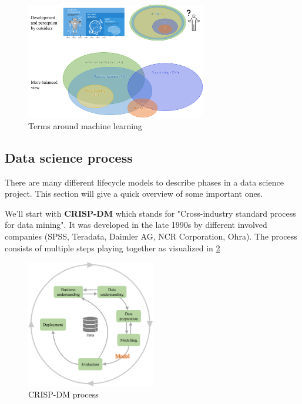 \begin{figure}[H]
  \centering
  \includegraphics[width=0.7\textwidth]{assets/basics/confusion_terminology.png}
  \caption{Terms around machine learning}
  \label{fig:1_ml_terminology}
\end{figure}


\subsection{Data science process}
There are many different lifecycle models to describe phases in a data science project. This section will give a quick overview of some important ones.

We'll start with \textbf{CRISP-DM} which stands for "Cross-industry standard process for data mining". It was developed in the late 1990s by different involved companies (SPSS, Teradata, Daimler AG, NCR Corporation, Ohra). The process consists of multiple steps playing together as visualized in \ref{fig:1_crisp_dm}

\begin{figure}[H]
  \centering
  \includegraphics[width=0.5\textwidth]{assets/basics/crisp-dm.png}
  \caption{CRISP-DM process}
  \label{fig:1_crisp_dm}
\end{figure}

